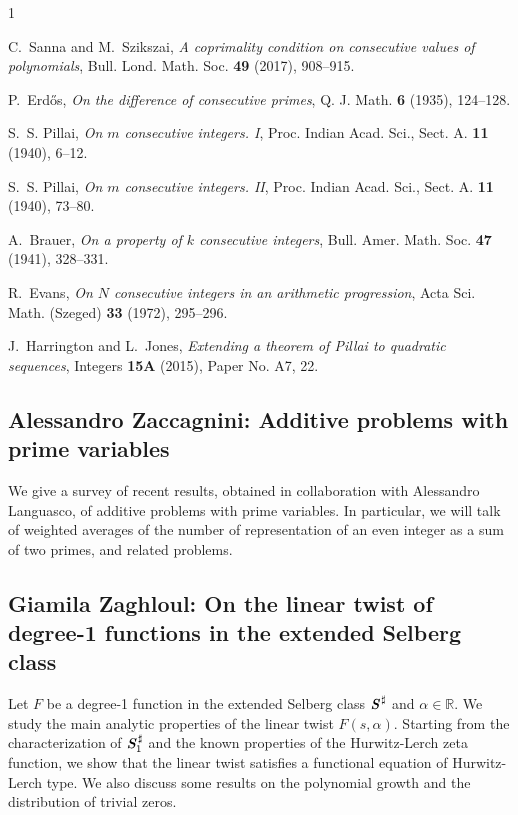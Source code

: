 \documentclass[15pt]{article}
\begin{document}

{\small
\begin{thebibliography}{1}

C.~Sanna and M.~Szikszai, \emph{A coprimality condition on consecutive values
  of polynomials}, Bull. Lond. Math. Soc. \textbf{49} (2017), 908--915.

P.~Erd\H{o}s, \emph{On the difference of consecutive primes}, Q. J. Math.
  \textbf{6} (1935), 124--128.

S.~S. Pillai, \emph{On {$m$} consecutive integers. {I}}, Proc. Indian Acad.
  Sci., Sect. A. \textbf{11} (1940), 6--12.

S.~S. Pillai, \emph{On {$m$} consecutive integers. {II}}, Proc. Indian Acad.
  Sci., Sect. A. \textbf{11} (1940), 73--80.

A.~Brauer, \emph{On a property of {$k$} consecutive integers}, Bull. Amer.
  Math. Soc. \textbf{47} (1941), 328--331.

R.~Evans, \emph{On {$N$} consecutive integers in an arithmetic progression},
  Acta Sci. Math. (Szeged) \textbf{33} (1972), 295--296.

J.~Harrington and L.~Jones, \emph{Extending a theorem of {P}illai to quadratic
  sequences}, Integers \textbf{15A} (2015), Paper No. A7, 22.

\end{thebibliography}
}

\subsection*{Alessandro Zaccagnini: Additive problems with prime variables}

We give a survey of recent results, obtained in collaboration with Alessandro Languasco, of additive problems with prime variables. In particular, we will talk of weighted averages of the number of representation of an even integer as a sum of two primes, and related problems.

\subsection*{Giamila Zaghloul: On the linear twist of degree-1 functions in the extended Selberg class}
	Let $F$ be a degree-1 function in the extended Selberg class $\emph{\textbf{S}}^{\, \sharp}$ and $\alpha\in\mathbb R$. We study the main analytic properties of the linear twist $F(s,\alpha)$. Starting from the characterization of $\emph{\textbf{S}}^{\,\sharp}_1$ and the known properties of the Hurwitz-Lerch zeta function, we show that the linear twist satisfies a functional equation of Hurwitz-Lerch type. We also discuss some results on the polynomial growth and the distribution of trivial zeros.
\end{document}
